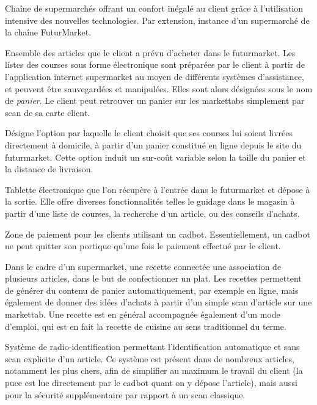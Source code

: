 Chaîne de supermarchés offrant un confort inégalé au client grâce à l'utilisation intensive des nouvelles technologies.
Par extension, instance d'un supermarché de la chaîne FuturMarket.
\par

Ensemble des articles que le client a prévu d'acheter dans le futurmarket.
Les listes des courses sous forme électronique sont préparées par le client à partir de l'application internet supermarket au moyen de différents systèmes d'assistance, et peuvent être sauvegardées et manipulées. 
Elles sont alors désignées sous le nom de {\em panier}.
Le client peut retrouver un panier sur les markettabs simplement par scan de sa carte client.
\par

Désigne l'option par laquelle le client choisit que ses courses lui soient livrées directement à domicile, à partir d'un panier constitué en ligne depuis le site du futurmarket.
Cette option induit un sur-coût variable selon la taille du panier et la distance de livraison.
\par

Tablette électronique que l'on récupère à l'entrée dans le futurmarket et dépose à la sortie.
Elle offre diverses fonctionnalités telles le guidage dans le magasin à partir d'une liste de courses, la recherche d'un article, ou des conseils d'achats.
\par

Zone de paiement pour les clients utilisant un cadbot.
Essentiellement, un cadbot ne peut quitter son portique qu'une fois le paiement effectué par le client.
\par

Dans le cadre d'un supermarket, une recette connectée une association de plusieurs articles, dans le but de confectionner un plat. 
Les recettes permettent de générer du contenu de panier automatiquement, par exemple en ligne, mais également de donner des idées d'achats à partir d'un simple scan d'article sur une markettab.
Une recette est en général accompagnée également d'un mode d'emploi, qui est en fait la recette de cuisine au sens traditionnel du terme.
\par 

Système de radio-identification permettant l'identification automatique et sans scan explicite d'un article.
Ce système est présent dans de nombreux articles, notamment les plus chers, afin de simplifier au maximum le travail du client (la puce est lue directement par le cadbot quant on y dépose l'article), mais aussi pour la sécurité supplémentaire par rapport à un scan classique.
\par

